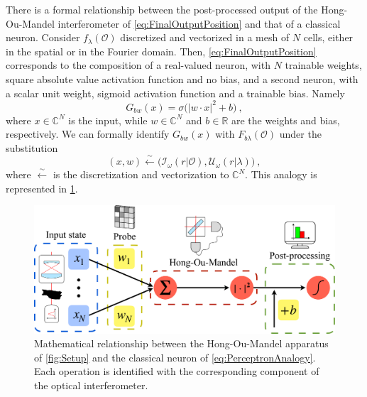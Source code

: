 \documentclass[reprint,
superscriptaddress,
nofootinbib,
aps,
pra,
showkeys
]{revtex4-2}
\newcommand{\I}{\mathcal{I}}
\newcommand{\U}{\mathcal{U}}
\renewcommand{\O}{\mathcal{O}}
\begin{document}
There is a formal relationship between the post-processed output of the Hong-Ou-Mandel interferometer of \cref{eq:FinalOutputPosition} and that of a classical neuron. Consider $f_{\lambda}(\O)$ discretized and vectorized in a mesh of $N$ cells, either in the spatial or in the Fourier domain. Then, \cref{eq:FinalOutputPosition} corresponds to the composition of a real-valued neuron, with $N$ trainable weights, square absolute value activation function and no bias, and a second neuron, with a scalar unit weight, sigmoid activation function and a trainable bias. Namely
\begin{equation}
   G_{bw}(x) = \sigma\big(|w \cdot x|^2 + b \big) \ ,
   \label{eq:PerceptronAnalogy}
\end{equation}
where $x \in \mathbb{C}^{N}$ is the input, while $w \in \mathbb{C}^{N}$ and $b \in \mathbb{R}$ are the weights and bias, respectively. We can formally identify $G_{bw}(x)$ with $F_{b\lambda}(\O)$ under the substitution
\begin{equation}
	\left( x, w \right) \xleftarrow{\sim} \big( \I_\omega (r|\O),  \U_\omega (r|\lambda) \big)  \ ,
\end{equation}
where $\xleftarrow{\sim}$ is the discretization and vectorization to $\mathbb{C}^{N}$. This analogy is represented in \cref{fig:Perceptron}.
\begin{figure}
    \centering
    \includegraphics[width = 0.425 \textwidth]{Neuron.pdf}
    \caption{Mathematical relationship between the Hong-Ou-Mandel apparatus of \cref{fig:Setup} and the classical neuron of \cref{eq:PerceptronAnalogy}. Each operation is identified with the corresponding component of the optical interferometer.}
    \label{fig:Perceptron}
\end{figure}
\end{document}
